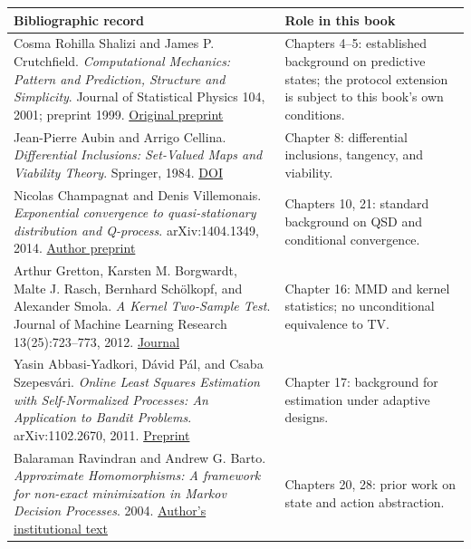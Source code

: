 \documentclass[
  english,
  11pt,
  oneside]{book}
\newcounter{none} %
\begin{document}
{\def\LTcaptype{none} %
\begin{longtable}[]{@{}
  >{\raggedright\arraybackslash}p{}
  >{\raggedright\arraybackslash}p{}@{}}
\toprule\noalign{}
\begin{minipage}[b]{\linewidth}\raggedright
Bibliographic record
\end{minipage} & \begin{minipage}[b]{\linewidth}\raggedright
Role in this book
\end{minipage} \\
\midrule\noalign{}
\endhead
\bottomrule\noalign{}
\endlastfoot
Cosma Rohilla Shalizi and James P. Crutchfield. \emph{Computational Mechanics: Pattern and Prediction, Structure and Simplicity}. Journal of Statistical Physics 104, 2001; preprint 1999. \href{https://arxiv.org/abs/cond-mat/9907176}{Original preprint} & Chapters 4--5: established background on predictive states; the protocol extension is subject to this book's own conditions. \\
Jean-Pierre Aubin and Arrigo Cellina. \emph{Differential Inclusions: Set-Valued Maps and Viability Theory}. Springer, 1984. \href{https://doi.org/10.1007/978-3-642-69512-4}{DOI} & Chapter 8: differential inclusions, tangency, and viability. \\
Nicolas Champagnat and Denis Villemonais. \emph{Exponential convergence to quasi-stationary distribution and Q-process}. arXiv:1404.1349, 2014. \href{https://arxiv.org/abs/1404.1349}{Author preprint} & Chapters 10, 21: standard background on QSD and conditional convergence. \\
Arthur Gretton, Karsten M. Borgwardt, Malte J. Rasch, Bernhard Schölkopf, and Alexander Smola. \emph{A Kernel Two-Sample Test}. Journal of Machine Learning Research 13(25):723--773, 2012. \href{https://www.jmlr.org/papers/v13/gretton12a.html}{Journal} & Chapter 16: MMD and kernel statistics; no unconditional equivalence to TV. \\
Yasin Abbasi-Yadkori, Dávid Pál, and Csaba Szepesvári. \emph{Online Least Squares Estimation with Self-Normalized Processes: An Application to Bandit Problems}. arXiv:1102.2670, 2011. \href{https://arxiv.org/abs/1102.2670}{Preprint} & Chapter 17: background for estimation under adaptive designs. \\
Balaraman Ravindran and Andrew G. Barto. \emph{Approximate Homomorphisms: A framework for non-exact minimization in Markov Decision Processes}. 2004. \href{https://all.cs.umass.edu/pubs/2004/ravindran_b_KBCS04.pdf}{Author's institutional text} & Chapters 20, 28: prior work on state and action abstraction. \\

\end{longtable}}
\end{document}
